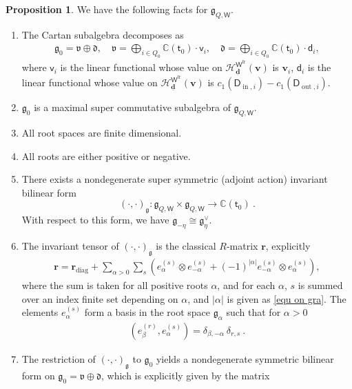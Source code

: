 \documentclass[10pt]{amsart}
\theoremstyle{definition}
\newtheorem{Proposition}[Theorem]{Proposition}
\numberwithin{equation}{section}
\newcommand{\bC}{\mathbb{C}}
\newcommand{\bv}{\mathbf{v}}
\newcommand{\bd}{\mathbf{d}}
\newcommand{\cH}{\mathcal{H}}
\newcommand{\sW}{\mathsf{W}}
\newcommand{\diag}{\operatorname{diag}}
\newcommand{\In}{\operatorname{in}}
\newcommand{\Out}{\operatorname{out}}
\begin{document}
\begin{Proposition}
\label{prop g(Q,w)}
We have the following facts for $\mathfrak{g}_{Q,\sW}$.
\begin{enumerate}
\item The Cartan subalgebra decomposes as 
\begin{align*}
    \mathfrak{g}_0=\mathfrak{v}\oplus\mathfrak{d},\quad \mathfrak{v}=\bigoplus_{i\in Q_0}\bC(\mathsf t_0)\cdot\mathsf v_i,\quad \mathfrak{d}=\bigoplus_{i\in Q_0}\bC(\mathsf t_0)\cdot\mathsf d_i,
\end{align*}
where $\mathsf v_i$ is the linear functional whose value on $\cH^{\sW^{\mathrm{fr}}}_{\underline{\bd}}(\bv)$ is $\bv_i$, $\mathsf d_i$ is the linear functional whose value on $\cH^{\sW^{\mathrm{fr}}}_{\underline{\bd}}(\bv)$ is $c_1(\mathsf D_{\In,i})-c_1(\mathsf D_{\Out,i})$.
\item $\mathfrak{g}_0$ is a maximal super commutative subalgebra of $\mathfrak{g}_{Q,\sW}$.
\item All root spaces are finite dimensional.
\item All roots are either positive or negative. 
\item There exists a nondegenerate super symmetric (adjoint action) invariant bilinear form $$(\cdot,\cdot)_{\mathfrak{g}}\colon \mathfrak{g}_{Q,\sW}\times \mathfrak{g}_{Q,\sW}\to \bC(\mathsf t_0)\:. $$ 
With respect to this form, we have $\mathfrak{g}_{-\eta}\cong \mathfrak{g}_\eta^{\vee}$.
\item The invariant tensor of $(\cdot,\cdot)_{\mathfrak{g}}$ is the classical $R$-matrix $\pmb r$, explicitly
\begin{align}\label{explicit r matrix}
    \pmb r=\pmb r_{\diag}+\sum_{\alpha > 0}\sum_s \left(e_{\alpha}^{(s)}\otimes e_{-\alpha}^{(s)}+(-1)^{|\alpha|}e_{-\alpha}^{(s)}\otimes e_{\alpha}^{(s)}\right),
\end{align}
where the sum is taken for all positive roots $\alpha$,
and for each $\alpha$,
$s$ is summed over an index finite set depending on $\alpha$, and $|\alpha|$ is given as \eqref{equ on gra}.
The elements $e_{\alpha}^{(s)}$ form a basis in the root space $\mathfrak{g}_{\alpha}$ such that for $\alpha>0$
\begin{align*}
    (e_{\beta}^{(r)},e_{\alpha}^{(s)})=\delta_{\beta,-\alpha}\:\delta_{r,s}\:.
\end{align*}
\item The restriction of $(\cdot,\cdot)_{\mathfrak{g}}$ to $\mathfrak{g}_0$ yields a nondegenerate symmetric bilinear form on $\mathfrak{g}_0=\mathfrak{v}\oplus\mathfrak{d}$, which is explicitly given by the matrix 

\end{enumerate}
\end{Proposition}
\end{document}
